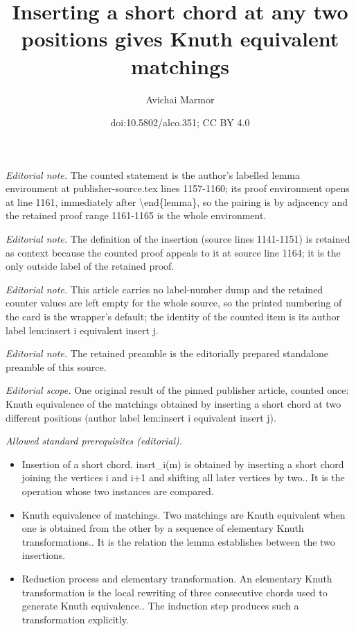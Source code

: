 \documentclass[11pt]{article}
\title{Inserting a short chord at any two positions gives Knuth equivalent matchings}
\author{Avichai Marmor}
\date{doi:10.5802/alco.351; CC BY 4.0}
\theoremstyle{definition}
\numberwithin{equation}{section}
\begin{document}
\maketitle
\noindent\textit{Editorial note.} The counted statement is the author's labelled lemma environment at publisher-source.tex lines 1157-1160; its proof environment opens at line 1161, immediately after \textbackslash{}end\{lemma\}, so the pairing is by adjacency and the retained proof range 1161-1165 is the whole environment.\par\medskip
\noindent\textit{Editorial note.} The definition of the insertion (source lines 1141-1151) is retained as context because the counted proof appeals to it at source line 1164; it is the only outside label of the retained proof.\par\medskip
\noindent\textit{Editorial note.} This article carries no label-number dump and the retained counter values are left empty for the whole source, so the printed numbering of the card is the wrapper's default; the identity of the counted item is its author label lem:insert i equivalent insert j.\par\medskip
\noindent\textit{Editorial note.} The retained preamble is the editorially prepared standalone preamble of this source.\par\medskip
\noindent\textit{Editorial scope.} One original result of the pinned publisher article, counted once: Knuth equivalence of the matchings obtained by inserting a short chord at two different positions (author label lem:insert i equivalent insert j).\par\medskip
\noindent\textit{Allowed standard prerequisites (editorial).}\begin{itemize}
\item Insertion of a short chord. insrt\_i(m) is obtained by inserting a short chord joining the vertices i and i+1 and shifting all later vertices by two.. It is the operation whose two instances are compared.
\item Knuth equivalence of matchings. Two matchings are Knuth equivalent when one is obtained from the other by a sequence of elementary Knuth transformations.. It is the relation the lemma establishes between the two insertions.
\item Reduction process and elementary transformation. An elementary Knuth transformation is the local rewriting of three consecutive chords used to generate Knuth equivalence.. The induction step produces such a transformation explicitly.
\end{itemize}\medskip
\end{document}
